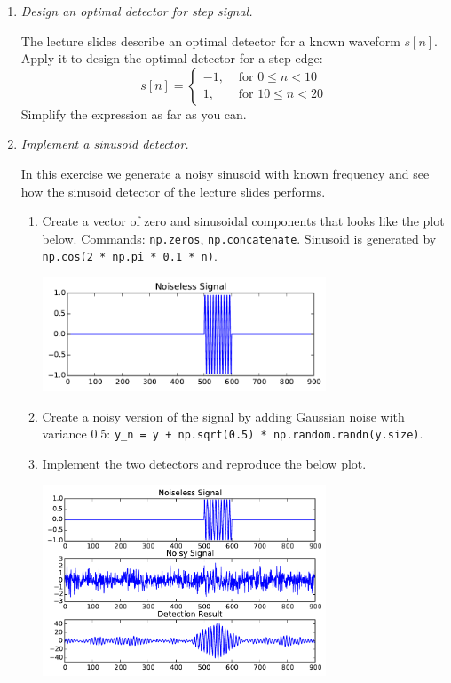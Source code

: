 \documentclass[a4paper,12pt]{scrartcl}
\newcommand{\python}{{\fbox{\texttt{\bfseries python}}\quad}}
\newcommand{\pen}{{\fbox{\texttt{\bfseries pen\&paper}}\quad}}
\begin{document}
\begin{enumerate}

\item \pen \emph{Design an optimal detector for step signal.}

The lecture slides describe an optimal detector for a known waveform $s[n]$.
Apply it to design the optimal detector for a step edge:
\[
s[n] = \begin{cases}
-1, & \text{ for } 0\le n < 10\\
1, & \text{ for } 10\le n < 20
\end{cases}
\]
Simplify the expression as far as you can.

\item \python \emph{Implement a sinusoid detector.}

In this exercise we generate a noisy sinusoid with known frequency and see how
the sinusoid detector of the lecture slides performs.

\begin{enumerate}
	\item Create a vector of zero and sinusoidal components that looks like the plot below.
	Commands: \verb+np.zeros+, \verb+np.concatenate+. Sinusoid is generated by
	\verb+np.cos(2 * np.pi * 0.1 * n)+.
	
	{\includegraphics[width=0.7\textwidth]{sinusoid.pdf}}
	
	\item Create a noisy version of the signal by adding Gaussian noise with variance 0.5:
	\verb|y_n = y + np.sqrt(0.5) * np.random.randn(y.size)|.
	
	\item Implement the two detectors and reproduce the below plot.
	
		{\includegraphics[width=0.7\textwidth]{sinusoidDetection.pdf}}
		

\end{enumerate}
\end{enumerate}
\end{document}
